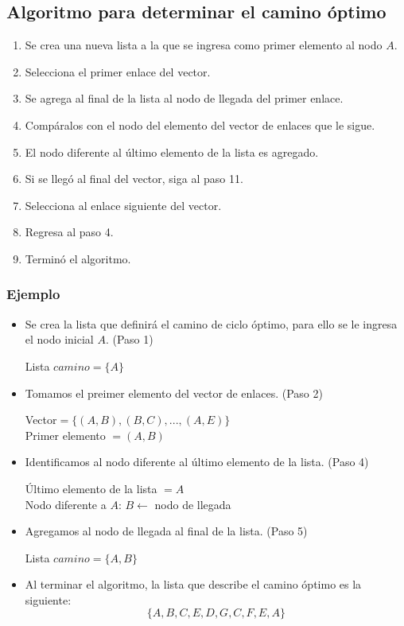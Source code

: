 \documentclass[12pt]{article}
\begin{document}
\subsection{Algoritmo para determinar el camino \'{o}ptimo}
\begin{enumerate}
\item Se crea una nueva lista a la que se ingresa como primer elemento al nodo $A$.
\item Selecciona el primer enlace del vector.
\item Se agrega al final de la lista al nodo de llegada del primer enlace.
\item Comp\'{a}ralos con el nodo del elemento del vector de enlaces que le sigue.
\item El nodo diferente al \'{u}ltimo elemento de la lista es agregado.
\item Si se lleg\'{o} al final del vector, siga al paso 11.
\item Selecciona al enlace siguiente del vector.
\item Regresa al paso 4.
\item Termin\'{o} el algoritmo.
\end{enumerate}
\pagebreak
\subsubsection{Ejemplo}
\begin{itemize}
\item Se crea la lista que definir\'{a} el camino de ciclo \'{o}ptimo, para ello se le ingresa el nodo inicial $A$. (Paso 1)
\begin{center}
Lista $camino=\{A\}$\\
\end{center}
\item Tomamos el preimer elemento del vector de enlaces. (Paso 2)
\begin{center}
Vector$=\{(A,B),(B,C),...,(A,E)\}$\\
Primer elemento $=(A,B)$\\
\end{center}
\item Identificamos al nodo diferente al \'{u}ltimo elemento de la lista. (Paso 4)
\begin{center}
\'{U}ltimo elemento de la lista $=A$\\
Nodo diferente a $A$: $B\leftarrow$ nodo de llegada\\
\end{center}
\item Agregamos al nodo de llegada al final de la lista. (Paso 5)
\begin{center}
Lista $camino=\{A,B\}$\\
\end{center}
\item Al terminar el algoritmo, la lista que describe el camino \'{o}ptimo es la siguiente:
$$\{A,B,C,E,D,G,C,F,E,A\}$$
\end{itemize}
\end{document}
